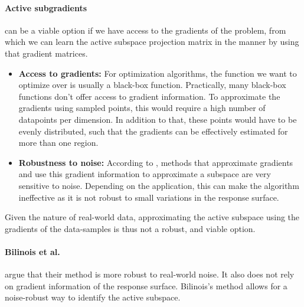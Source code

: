 \paragraph{Active subgradients} can be a viable option if we have access to the gradients of the problem, from which we can learn the active subspace projection matrix in the manner by using that gradient matrices.

\begin{itemize}

\item \textbf{Access to gradients:} For optimization algorithms, the function we want to optimize over is usually a black-box function.
Practically, many black-box functions don't offer access to gradient information.
To approximate the gradients using sampled points, this would require a high number of datapoints per dimension.
In addition to that, these points would have to be evenly distributed, such that the gradients can be effectively estimated for more than one region.

\item \textbf{Robustness to noise:} According to \citep{Tripathy}, methods that approximate gradients and use this gradient information to approximate a subspace are very sensitive to noise.
Depending on the application, this can make the algorithm ineffective as it is not robust to small variations in the response surface.

\end{itemize}

Given the nature of real-world data, approximating the active subspace using the gradients of the data-samples is thus not a robust, and viable option.

\paragraph{Bilinois et al.} argue that their method is more robust to real-world noise. 
It also does not rely on gradient information of the response surface.
Bilinois's method allows for a noise-robust way to identify the active subspace.

